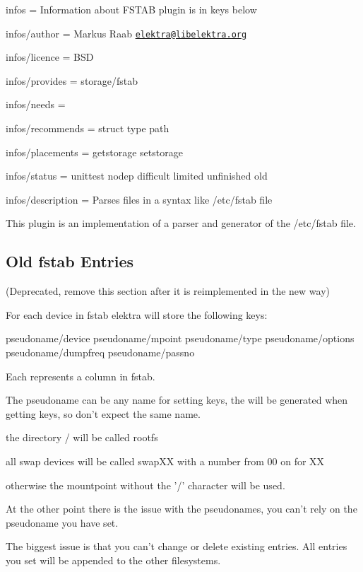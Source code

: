 
\begin{DoxyItemize}
\item infos = Information about F\+S\+T\+A\+B plugin is in keys below
\item infos/author = Markus Raab \href{mailto:elektra@libelektra.org}{\tt elektra@libelektra.\+org}
\item infos/licence = B\+S\+D
\item infos/provides = storage/fstab
\item infos/needs =
\item infos/recommends = struct type path
\item infos/placements = getstorage setstorage
\item infos/status = unittest nodep difficult limited unfinished old
\item infos/description = Parses files in a syntax like /etc/fstab file
\end{DoxyItemize}

This plugin is an implementation of a parser and generator of the /etc/fstab file.

\subsection*{Old fstab Entries}

(Deprecated, remove this section after it is reimplemented in the new way)

For each device in fstab elektra will store the following keys\+: \begin{DoxyVerb}pseudoname/device
pseudoname/mpoint
pseudoname/type
pseudoname/options
pseudoname/dumpfreq
pseudoname/passno
\end{DoxyVerb}


Each represents a column in fstab.

The pseudoname can be any name for setting keys, the will be generated when getting keys, so don't expect the same name.

the directory {\ttfamily /} will be called {\ttfamily rootfs}

all swap devices will be called {\ttfamily swap\+X\+X} with a number from 00 on for X\+X

otherwise the mountpoint without the '/' character will be used.

At the other point there is the issue with the pseudonames, you can't rely on the pseudoname you have set.

The biggest issue is that you can't change or delete existing entries. All entries you set will be appended to the other filesystems.

